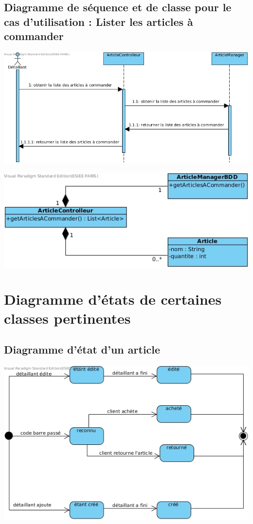 \subsection{Diagramme de séquence et de classe pour le cas d'utilisation : Lister les articles à commander}
\begin{center}
	\includegraphics[width=14cm]{DiagrammeSequenceListerArticlesACommander.jpg}
\end{center}
\begin{center}
	\includegraphics[width=14cm]{DiagrammeDeClasseListerArticlesACommander.jpg}
\end{center}


\section{Diagramme d'états de certaines classes pertinentes}

\subsection{Diagramme d'état d'un article}
\begin{center}
	\includegraphics[width=14cm]{DiagrammeEtatArticle.jpg}
\end{center}

